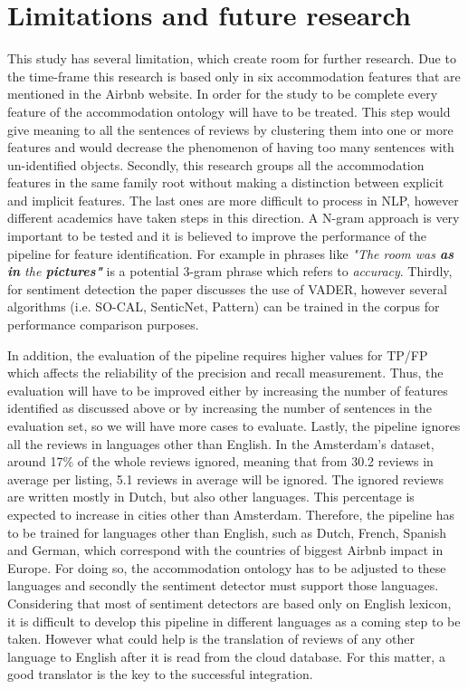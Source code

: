 \section{Limitations and future research}
This study has several limitation, which create room for further research. Due to the time-frame this research is based only in six accommodation features that are mentioned in the Airbnb website. In order for the study to be complete every feature of the accommodation ontology will have to be treated. This step would give meaning to all the sentences of reviews by clustering them into one or more features and would decrease the phenomenon of having too many sentences with un-identified objects. Secondly, this research groups all the accommodation features in the same family root without making a distinction between explicit and implicit features. The last ones are more difficult to process in NLP, however different academics have taken steps in this direction. A N-gram approach is very important to be tested and it is believed to improve the performance of the pipeline for feature identification. For example in phrases like \textit{"The room was \textbf{as in} the \textbf{pictures"}} is a potential 3-gram phrase which refers to \textit{accuracy}. Thirdly, for sentiment detection the paper discusses the use of VADER, however several algorithms (i.e. SO-CAL, SenticNet, Pattern)  can be trained in the corpus for performance comparison purposes. 


In addition, the evaluation of the pipeline requires higher values for TP/FP which affects the reliability of the precision and recall measurement. Thus, the evaluation will have to be improved either by increasing the number of features identified as discussed above or by increasing the number of sentences in the evaluation set, so we will have more cases to evaluate. Lastly, the pipeline ignores all the reviews in languages other than English. In the Amsterdam's dataset, around 17\% of the whole reviews ignored, meaning that from 30.2 reviews in average per listing, 5.1 reviews in average will be ignored. The ignored reviews are written mostly in Dutch, but also other languages. This percentage is expected to increase in cities other than Amsterdam. Therefore, the pipeline has to be trained for languages other than English, such as Dutch, French, Spanish and German, which correspond with the countries of biggest Airbnb impact in Europe. For doing so, the accommodation ontology has to be adjusted to these languages and secondly the sentiment detector must support those languages. Considering that most of sentiment detectors are based only on English lexicon, it is difficult to develop this pipeline in different languages as a coming step to be taken. However what could help is the translation of reviews of any other language to English after it is read from the cloud database. For this matter, a good translator is the key to the successful integration. 

